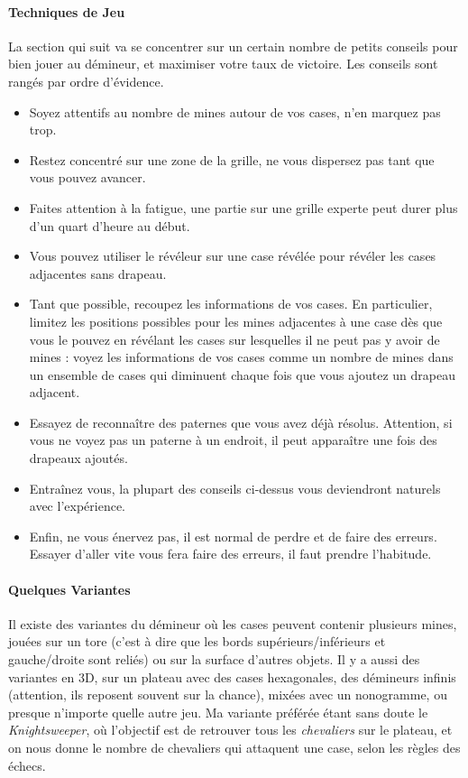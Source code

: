 \paragraph{Techniques de Jeu}
La section qui suit va se concentrer sur un certain nombre de petits conseils pour bien jouer au démineur, et maximiser votre taux de victoire. Les conseils sont rangés par ordre d'évidence.
\begin{itemize}
	\item Soyez attentifs au nombre de mines autour de vos cases, n'en marquez pas trop. 
	\item Restez concentré sur une zone de la grille, ne vous dispersez pas tant que vous pouvez avancer. 
	\item Faites attention à la fatigue, une partie sur une grille experte peut durer plus d'un quart d'heure au début.
	\item Vous pouvez utiliser le révéleur sur une case révélée pour révéler les cases adjacentes sans drapeau. 
	\item Tant que possible, recoupez les informations de vos cases. En particulier, limitez les positions possibles pour les mines adjacentes à une case dès que vous le pouvez en révélant les cases sur lesquelles il ne peut pas y avoir de mines : voyez les informations de vos cases comme un nombre de mines dans un ensemble de cases qui diminuent chaque fois que vous ajoutez un drapeau adjacent.
	\item Essayez de reconnaître des paternes que vous avez déjà résolus. Attention, si vous ne voyez pas un paterne à un endroit, il peut apparaître une fois des drapeaux ajoutés. 
	\item Entraînez vous, la plupart des conseils ci-dessus vous deviendront naturels avec l'expérience.
	\item Enfin, ne vous énervez pas, il est normal de perdre et de faire des erreurs. Essayer d'aller vite vous fera faire des erreurs, il faut prendre l'habitude.
\end{itemize}

\paragraph{Quelques Variantes}
Il existe des variantes du démineur où les cases peuvent contenir plusieurs mines, jouées sur un tore (c'est à dire que les bords supérieurs/inférieurs et gauche/droite sont reliés) ou sur la surface d'autres objets.
Il y a aussi des variantes en 3D, sur un plateau avec des cases hexagonales, des démineurs infinis (attention, ils reposent souvent sur la chance), mixées avec un nonogramme, ou presque n'importe quelle autre jeu. 
Ma variante préférée étant sans doute le \emph{Knightsweeper}, où l'objectif est de retrouver tous les \textit{chevaliers} sur le plateau, et on nous donne le nombre de chevaliers qui attaquent une case, selon les règles des échecs.




